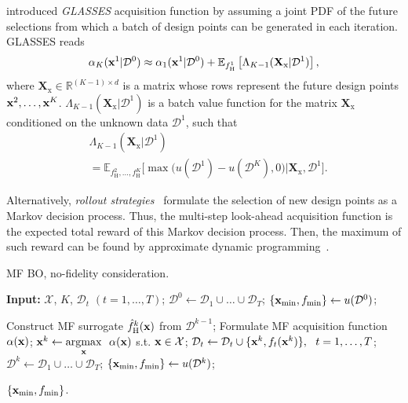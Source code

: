 \documentclass[iicol,sn-basic]{sn-jnl}%
\begin{document}
\cite{Gonzalez2016} introduced \textit{GLASSES} acquisition function by assuming a joint PDF of the future selections from which a batch of design points can be generated in each iteration.
GLASSES reads
\begin{equation}\label{Eq57}
		\alpha_K({\bf x}^1|\mathcal{D}^0) \approx \alpha_1({\bf x}^1|\mathcal{D}^0) + \mathbb{E}_{f^1_\text{H}}\left[\Lambda_{K-1}(\textbf{X}_\text{x}|\mathcal{D}^1)\right],
\end{equation}
where 
$\textbf{X}_\text{x} \in \mathbb{R}^{(K-1) \times d}$ is a matrix whose rows represent the future design points ${\bf x}^2,\dots,{\bf x}^K$. $\Lambda_{K-1}(\textbf{X}_\text{x}|\mathcal{D}^1)$ is a batch value function for the matrix  $\textbf{X}_\text{x}$ conditioned on the unknown data $\mathcal{D}^1$, such that 
\begin{equation}\label{Eq58}
	\begin{aligned}
	& \Lambda_{K-1}(\textbf{X}_\text{x}|\mathcal{D}^1)\\
	& =\mathbb{E}_{f_\text{H}^2,\dots,f_\text{H}^K}\Bigg[\max\Big(u(\mathcal{D}^1)-u(\mathcal{D}^K),0  \Big)|\textbf{X}_\text{x},\mathcal{D}^1\Bigg].
	\end{aligned}
\end{equation}

Alternatively, \textit{rollout strategies}~\citep{Lam2016,Lee2020} formulate the selection of new design points as a Markov
decision process.
Thus, the multi-step look-ahead acquisition function is the expected total reward of this Markov
decision process.
Then, the maximum of such reward can be found by approximate dynamic programming~\citep{Powell2011}.

\begin{algorithm}
	\caption{MF BO, no-fidelity consideration.}\label{Algo3}
	\begin{algorithmic}[1]
		\State \textbf{Input:} $\mathcal{X}$, $K$, $\mathcal{D}_t$ $(t=1,\dots,T)$;
		\State $\mathcal{D}^0 \gets \mathcal{D}_1 \cup \dots \cup \mathcal{D}_T$;
		\State $\{{\bf x}_{\min},f_{\min}\} \gets u(\mathcal{D}^0)$; \label{Algo3:3}
		
		\State Construct MF surrogate $\hat{f}_\text{H}^k({\bf x})$ from $\mathcal{D}^{k-1}$;
		\State Formulate MF acquisition function $\alpha({\bf x})$; \label{Algo3:6}
		\State ${\bf x}^{k} \gets \underset{{\bf x}}{\mathrm{argmax}} \ \ \alpha({\bf x})$ s.t. ${\bf x} \in \mathcal{X}$;
		\State $\mathcal{D}_t \gets \mathcal{D}_t \cup \{{\bf x}^{k},f_t({\bf x}^{k})\}, \ \ t=1,\dots,T$;
		\State $\mathcal{D}^k \gets \mathcal{D}_1 \cup \dots \cup \mathcal{D}_T$;
		\State $\{{\bf x}_{\min},f_{\min}\} \gets u(\mathcal{D}^k)$; \label{Algo3:10}
		\EndFor
		
		\State \Return $\{{\bf x}_{\min},f_{\min}\}$.
	\end{algorithmic}
\end{algorithm}
\end{document}
